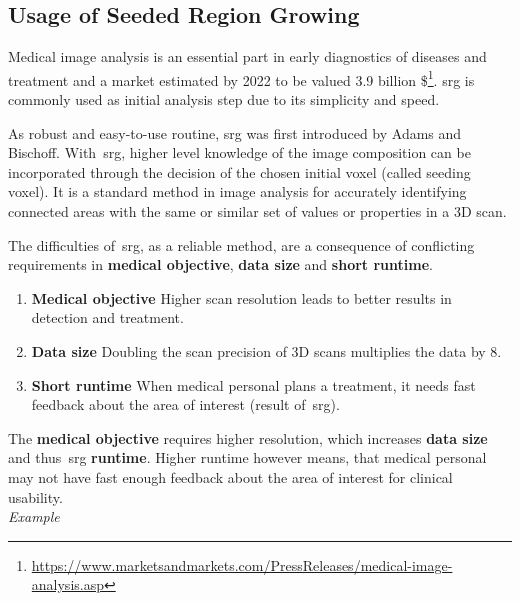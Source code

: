 \documentclass{article}
\begin{document}
\subsection{Usage of Seeded Region Growing}\label{subsec:problem}
Medical image analysis is an essential part in early diagnostics of diseases and treatment and a market estimated by 2022 to be valued 3.9 billion \$\footnote{\url{https://www.marketsandmarkets.com/PressReleases/medical-image-analysis.asp}}.
\Ac{srg} is commonly used as initial analysis step due to its simplicity and speed.\par
As robust and easy-to-use routine, \Ac{srg} was first introduced by Adams and Bischoff.
With~\Ac{srg}, higher level knowledge of the image composition can be incorporated through the decision of the chosen initial voxel (called seeding voxel).
It is a standard method in image analysis for accurately identifying connected areas with the same or similar set of values or properties in a 3D scan.\par
The difficulties of~\ac{srg}, as a reliable method, are a consequence of conflicting requirements in \textbf{medical objective}, \textbf{data size} and \textbf{short runtime}.
\begin{enumerate}
  \item \textbf{Medical objective} Higher scan resolution leads to better results in detection and treatment.
  \item \textbf{Data size} Doubling the scan precision of 3D scans multiplies the data by 8.
  \item \textbf{Short runtime} When medical personal plans a treatment, it needs fast feedback about the area of interest (result of~\ac{srg}).
\end{enumerate}
The \textbf{medical objective} requires higher resolution, which increases \textbf{data size} and thus~\ac{srg} \textbf{runtime}.
Higher runtime however means, that medical personal may not have fast enough feedback about the area of interest for clinical usability.\\
\textit{Example}
\end{document}
